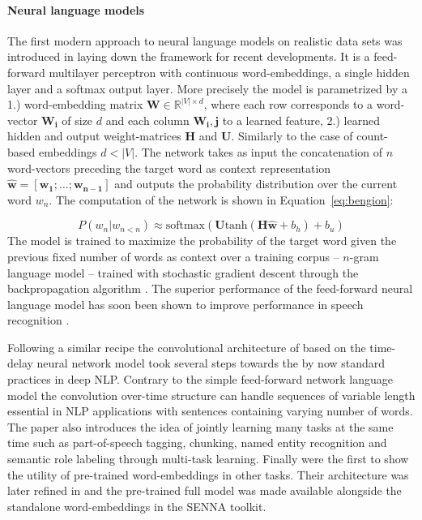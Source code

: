 \paragraph{Neural language models}
The first modern approach to neural language models on realistic data sets was introduced
in \cite{bengio2003neural} laying down the framework for recent developments.
It is a feed-forward multilayer perceptron with continuous word-embeddings,
a single hidden layer and a softmax output layer.
More precisely the model is parametrized by a 1.) word-embedding matrix
$\mathbf{W} \in \mathbb{R}^{|V| \times d}$, where each row corresponds to a word-vector
$\mathbf{W_i}$ of size $d$ and each column $\mathbf{W_i,j}$ to a learned feature, 2.)
learned hidden and output weight-matrices $\mathbf{H}$ and $\mathbf{U}$. Similarly
to the case of count-based embeddings $d < |V|$.
The network takes as input the concatenation of $n$ word-vectors preceding the target word as context
representation $\hat{\mathbf{w}} = [\mathbf{w_1}; \ldots; \mathbf{w_{n-1}}]$
and outputs the probability distribution over the current word $w_n$.
The computation of the network is shown in Equation~\ref{eq:bengion}:

\begin{equation}
\label{eq:bengio}
P(w_n|w_{n<n}) \approx \text{softmax}(\mathbf{U} \text{tanh}(\mathbf{H} \mathbf{\hat{w}} + b_h ) + b_u)
\end{equation}
The model is trained to maximize the probability of
the target word given the previous fixed number of words as context over a training corpus
-- $n$-gram language model -- trained with stochastic gradient descent \cite{cauchy1847methode}
through the backpropagation algorithm \cite{rumelhart1985learning}.
The superior performance of the feed-forward neural language model has soon been shown to
improve performance in speech recognition \cite{schwenk2005training}.

Following a similar recipe the convolutional architecture of  \cite{collobert2008unified}
based on the time-delay neural network model \cite{waibel1990phoneme} took several steps towards the
by now standard practices in deep NLP.
Contrary to the simple feed-forward network language model the convolution over-time structure can handle
sequences of variable length essential in NLP applications with sentences containing varying number of words.
The paper also introduces the idea of jointly learning many tasks at the same time such as part-of-speech
tagging, chunking, named entity recognition and semantic role labeling through multi-task learning.
Finally \cite{collobert2008unified} were the first to show the utility of pre-trained word-embeddings
in other tasks. Their architecture was later refined in \cite{collobert2011natural} and the pre-trained
full model was made available alongside the standalone word-embeddings in the SENNA toolkit.

